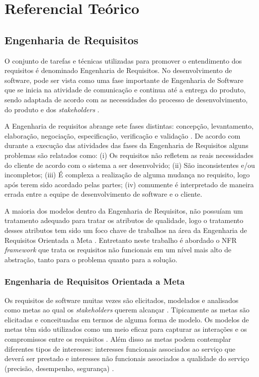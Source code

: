 \chapter[Referencial Teórico]{Referencial Teórico}

\section{Engenharia de Requisitos}

O conjunto de tarefas e técnicas utilizadas para promover o entendimento dos requisitos é denominado Engenharia de Requisitos. No desenvolvimento de software, pode ser vista como uma fase importante de Engenharia de Software que se inicia na atividade de comunicação e continua até a entrega do produto, sendo adaptada de acordo com as necessidades do processo de desenvolvimento, do produto e dos \textit{stakeholders} \cite{pressman2011engenharia}.

A Engenharia de requisitos abrange sete fases distintas: concepção, levantamento, elaboração, negociação, especificação, verificação e validação \cite{pressman2011engenharia}. De acordo com \cite{kotonya1998requirements} durante a execução das atividades das fases da Engenharia de Requisitos alguns problemas são relatados como: (i) Os requisitos não refletem as reais necessidades do cliente de acordo com o sistema a ser desenvolvido; (ii) São inconsistentes e/ou incompletos; (iii) É complexa a realização de alguma mudança no requisito, logo após terem sido acordado pelas partes; (iv) comumente é interpretado de maneira errada entre a equipe de desenvolvimento de software e o cliente.  

A maioria dos modelos dentro da Engenharia de Requisitos, não possuíam um tratamento adequado para tratar os atributos de qualidade, logo o tratamento desses atributos tem sido um foco chave de trabalhos na área da Engenharia de Requisitos Orientada a Meta \cite{chung2012non}. Entretanto neste trabalho é abordado o NFR \textit{framework} que trata os requisitos não funcionais em um nível mais alto de abstração, tanto para o problema quanto para a solução. 

\subsection{Engenharia de Requisitos Orientada a Meta}

Os requisitos de software muitas vezes são elicitados, modelados e analisados como metas ao qual os \textit{stakeholders} querem alcançar \cite{van2001goal}. Tipicamente as metas são elicitadas e conceituadas  em termos de alguma forma de modelo. Os modelos de metas têm sido utilizados como um meio eficaz para capturar as interações e os compromissos entre os requisitos \cite{letier2002deriving}. Além disso as metas podem contemplar diferentes tipos de interesses: interesses funcionais associados ao serviço que deverá ser prestado e interesses não funcionais associados a qualidade do serviço (precisão, desempenho, segurança) \cite{van2001goal}.
 
